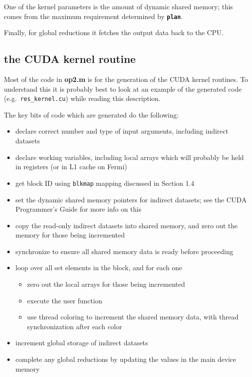 \documentclass[12pt]{article}
\begin{document}
One of the kernel parameters is the amount of dynamic shared 
memory; this comes from the maximum requirement determined 
by {\tt \bf plan}.

Finally, for global reductions it fetches the output data back
to the CPU.

\newpage

\subsection{the CUDA kernel routine}

Most of the code in {\bf op2.m} is for the generation of the CUDA 
kernel routines.  To understand this it is probably best to look
at an example of the generated code (e.g.~{\tt res\_kernel.cu})
while reading this description.

The key bits of code which are generated do the following:
\begin{itemize}
\item
declare correct number and type of input arguments, including
indirect datasets

\item
declare working variables, including local arrays which will probably
be held in registers (or in L1 cache on Fermi)

\item
get block ID using {\tt blkmap} mapping discussed in Section 1.4

\item
set the dynamic shared memory pointers for indirect datasets; see 
the CUDA Programmer's Guide for more info on this

\item
copy the read-only indirect datasets into shared memory, 
and zero out the memory for those being incremented

\item
synchronize to ensure all shared memory data is ready before proceeding

\item
loop over all set elements in the block, and for each one
 \begin{itemize}
 \item zero out the local arrays for those being incremented
 \item execute the user function
 \item use thread coloring to increment the shared memory data,
       with thread synchronization after each color
 \end{itemize}

\item
increment global storage of indirect datasets 

\item
complete any global reductions by updating the values in the main device 
memory

\end{itemize}
\end{document}
